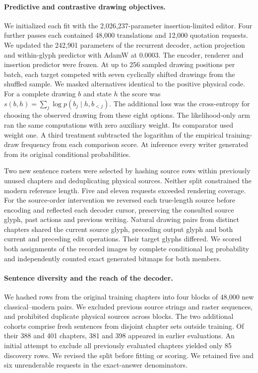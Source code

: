 \documentclass[12pt,a4paper]{article}
\providecommand{\DIFadd}[1]{{\protect\color{blue} \sf #1}} %
\begin{document}
\paragraph{\DIFadd{Predictive and contrastive drawing objectives.}}
\DIFadd{We initialized each fit with the 2,026,237-parameter insertion-limited editor. Four further passes each contained 48,000 translations and 12,000 quotation requests. We updated the 242,901 parameters of the recurrent decoder, action projection and within-glyph predictor with AdamW at 0.0003. The encoder, renderer and insertion predictor were frozen. At up to 256 sampled drawing positions per batch, each target competed with seven cyclically shifted drawings from the shuffled sample. We masked alternatives identical to the positive physical code. For a complete drawing $b$ and state $h$ the score was $s(b,h)=\sum_j\log p(b_j\mid h,b_{<j})$. The additional loss was the cross-entropy for choosing the observed drawing from these eight options. The likelihood-only arm ran the same computations with zero auxiliary weight. Its comparator used weight one. A third treatment subtracted the logarithm of the empirical training-draw frequency from each comparison score. At inference every writer generated from its original conditional probabilities.
}

\DIFadd{Two new sentence rosters were selected by hashing source rows within previously unused chapters and deduplicating physical sources. Neither split constrained the modern reference length. Five and eleven requests exceeded rendering coverage. For the source-order intervention we reversed each true-length source before encoding and reflected each decoder cursor, preserving the consulted source glyph, past actions and previous writing. Natural drawing pairs from distinct chapters shared the current source glyph, preceding output glyph and both current and preceding edit operations. Their target glyphs differed. We scored both assignments of the recorded images by complete conditional log probability and independently counted exact generated bitmaps for both members.
}

\paragraph{\DIFadd{Sentence diversity and the reach of the decoder.}}
\DIFadd{We hashed rows from the original training chapters into four blocks of 48,000 new classical--modern pairs. We excluded previous source strings and raster sequences, and prohibited duplicate physical sources across blocks. The two additional cohorts comprise fresh sentences from disjoint chapter sets outside training. Of their 388 and 401 chapters, 381 and 398 appeared in earlier evaluations. An initial attempt to exclude all previously evaluated chapters yielded only 85 discovery rows. We revised the split before fitting or scoring. We retained five and six unrenderable requests in the exact-answer denominators.
}
\end{document}
